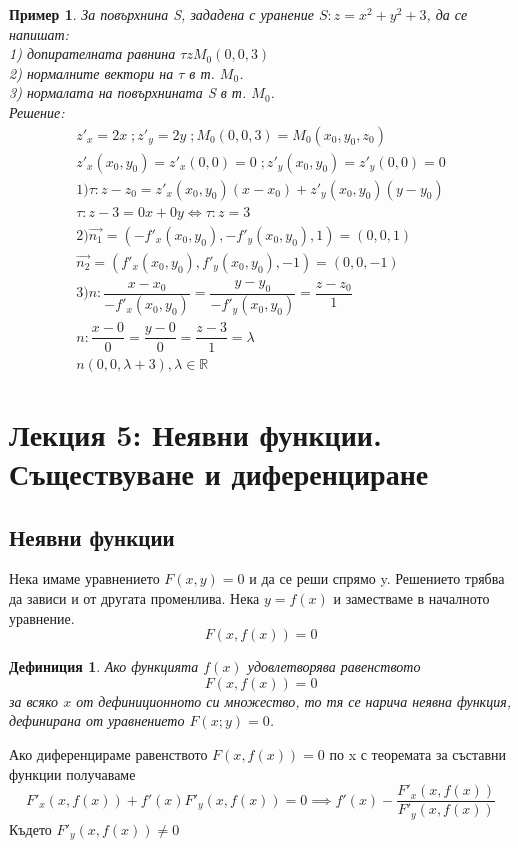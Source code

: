 \documentclass[a4paper,fleqn,12pt]{article}
\newtheorem{definition}{Дефиниция}[subsection]
\newtheorem{example}{Пример}[subsection]
\begin{document}
\begin{example}
За повърхнина S, зададена с уранение $S: z= x^2 + y^2 + 3$, да се напишат: \\
1) допирателната равнина $\tau z  M_0 (0, 0, 3)$ \\
2) нормалните вектори на $\tau$ в т. $M_0$.\\
3) нормалата на повърхнината S в т. $M_0$. \\
Решение:
\begin{gather*}
z'_x = 2x\; ; z'_y = 2y\; ; M_0(0,0,3) = M_0(x_0, y_0, z_0) \\
z'_x(x_0, y_0) = z'_x(0,0) = 0\; ; z'_y(x_0, y_0) = z'_y(0,0) = 0\\
1) \tau : z - z_0 = z'_x (x_0, y_0)(x - x_0) + z'_y (x_0, y_0)(y - y_0) \\
\tau : z - 3 = 0x + 0y \Leftrightarrow \tau: z = 3\\
2)
\vec {n_1} = (-f'_x (x_0, y_0), -f'_y (x_0, y_0), 1) = (0, 0, 1) \\
\vec {n_2} = (f'_x (x_0, y_0), f'_y (x_0, y_0), -1) = (0, 0, -1) \\
3) 
n: \dfrac{x - x_0}{-f'_x (x_0, y_0)} = \dfrac{y-y_0}{-f'_y (x_0, y_0)} = \dfrac{z - z_0}{1} \\
n: \dfrac{x - 0}{0} = \dfrac{y-0}{0} = \dfrac{z - 3}{1} = \lambda \\
n (0, 0, \lambda + 3), \lambda \in \mathbb{R}
\end{gather*}
\end{example}

\newpage

\section{Лекция 5: Неявни функции. Съществуване и диференциране }

\subsection{Неявни функции}
Нека имаме уравнението $F(x,y) = 0$ и да се реши спрямо y. Решението трябва да зависи и от другата променлива. Нека $y = f(x)$ и заместваме в началното уравнение. 
$$F(x,f(x)) = 0$$

\begin{definition}
Ако функцията $f(x)$ удовлетворява равенството 
$$F(x,f(x)) = 0$$
за всяко $x$ от дефиниционното си множество, то тя се нарича неявна функция, дефинирана от уравнението $F(x;y) = 0$.
\end{definition}
Ако диференцираме равенството $F(x,f(x)) = 0$ по x с теоремата за съставни функции получаваме 
$$F'_x(x,f(x)) + f'(x)F'_y(x,f(x)) = 0 \implies f'(x) - \dfrac{F'_x(x,f(x))}{F'_y(x,f(x))}$$
Където $F'_y(x,f(x)) \neq 0$
\end{document}
